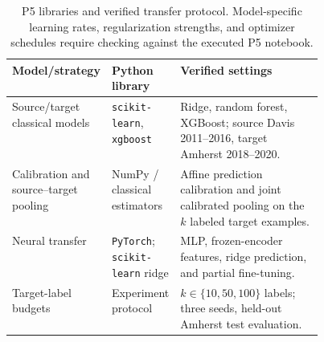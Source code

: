 \begin{table}[!htbp]\centering\footnotesize
\caption{P5 libraries and verified transfer protocol. Model-specific learning rates, regularization strengths, and optimizer schedules require checking against the executed P5 notebook.}\label{tab:p5impl}
\begin{tabularx}{\linewidth}{@{}p{0.24\linewidth}p{0.21\linewidth}X@{}}\toprule
\textbf{Model/strategy} & \textbf{Python library} & \textbf{Verified settings}\\\midrule
Source/target classical models & \texttt{scikit-learn}, \texttt{xgboost} & Ridge, random forest, XGBoost; source Davis 2011--2016, target Amherst 2018--2020.\\
Calibration and source--target pooling & NumPy / classical estimators & Affine prediction calibration and joint calibrated pooling on the $k$ labeled target examples.\\
Neural transfer & \texttt{PyTorch}; \texttt{scikit-learn} ridge & MLP, frozen-encoder features, ridge prediction, and partial fine-tuning.\\
Target-label budgets & Experiment protocol & $k\in\{10,50,100\}$ labels; three seeds, held-out Amherst test evaluation.\\
\bottomrule\end{tabularx}
\end{table}
